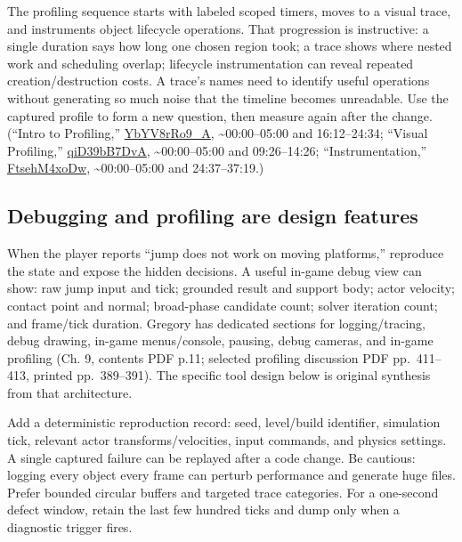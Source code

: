 \hypertarget{06-engine-ii-ch041-put-diagnostic-costs-beside-the-feature}{}

The profiling sequence starts with labeled scoped timers, moves to a visual trace, and instruments object lifecycle operations. That progression is instructive: a single duration says how long one chosen region took; a trace shows where nested work and scheduling overlap; lifecycle instrumentation can reveal repeated creation/destruction costs. A trace's names need to identify useful operations without generating so much noise that the timeline becomes unreadable. Use the captured profile to form a new question, then measure again after the change. (``Intro to Profiling,'' \href{https://www.youtube.com/watch?v=YbYV8rRo9_A}{YbYV8rRo9\_A}, \textasciitilde00:00--05:00 and 16:12--24:34; ``Visual Profiling,'' \href{https://www.youtube.com/watch?v=qiD39bB7DvA}{qiD39bB7DvA}, \textasciitilde00:00--05:00 and 09:26--14:26; ``Instrumentation,'' \href{https://www.youtube.com/watch?v=FtsehM4xoDw}{FtsehM4xoDw}, \textasciitilde00:00--05:00 and 24:37--37:19.)

\subsection{Debugging and profiling are design features}\label{06-engine-ii-ch041-debugging-and-profiling-are-design-features}

\hypertarget{06-engine-ii-ch041-debugging-and-profiling-are-design-features}{}

When the player reports ``jump does not work on moving platforms,'' reproduce the state and expose the hidden decisions. A useful in-game debug view can show: raw jump input and tick; grounded result and support body; actor velocity; contact point and normal; broad-phase candidate count; solver iteration count; and frame/tick duration. Gregory has dedicated sections for logging/tracing, debug drawing, in-game menus/console, pausing, debug cameras, and in-game profiling (Ch. 9, contents PDF p.11; selected profiling discussion PDF pp.~411--413, printed pp.~389--391). The specific tool design below is original synthesis from that architecture.

Add a deterministic reproduction record: seed, level/build identifier, simulation tick, relevant actor transforms/velocities, input commands, and physics settings. A single captured failure can be replayed after a code change. Be cautious: logging every object every frame can perturb performance and generate huge files. Prefer bounded circular buffers and targeted trace categories. For a one-second defect window, retain the last few hundred ticks and dump only when a diagnostic trigger fires.

